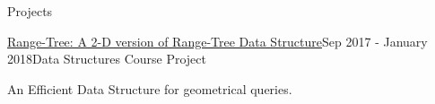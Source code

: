 \documentclass{resume} %
\begin{document}
\begin{rSection}{Projects}
		
		\begin{rSubsection}{\href{https://github.com/pouyaaghahoseini/DS-Course}{Range-Tree: A 2-D version of Range-Tree Data Structure}}{Sep 2017 - January 2018}{Data Structures Course Project}{ }
			\item An Efficient Data Structure for geometrical queries.
		\end{rSubsection}
	\end{rSection}
\end{document}
